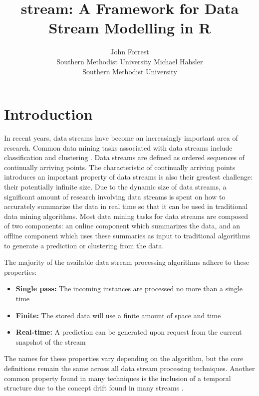 \documentclass[nojss]{jss}
\author{John Forrest\\Southern Methodist University \And
    Michael Hahsler\\Southern Methodist University}
\title{stream: A Framework for Data Stream Modelling in R}
\begin{document}

\clearpage
\tableofcontents
\clearpage

\section{Introduction}

In recent years, data streams have become an increasingly important area of research. Common data mining tasks associated with data streams include classification and clustering \citep{stream:Aggarwal:2009}. Data streams are defined as ordered sequences of continually arriving points. The characteristic of continually arriving points introduces an important property of data streams is also their greatest challenge: their potentially infinite size. Due to the dynamic size of data streams, a significant amount of research involving data streams is spent on how to accurately summarize the data in real time so that it can be used in traditional data mining algorithms. Most data mining tasks for data streams are composed of two components: an online component which summarizes the data, and an offline component which uses these summaries as input to traditional algorithms to generate a prediction or clustering from the data.


The majority of the available data stream processing algorithms adhere to these properties:

\begin{itemize}
	\item \textbf{Single pass:} The incoming instances are processed no more than a single time
	\item \textbf{Finite:} The stored data will use a finite amount of space and time
	\item \textbf{Real-time:} A prediction can be generated upon request from the current snapshot of the stream
\end{itemize}


The names for these properties vary depending on the algorithm, but the core definitions remain the same across all data stream processing techniques. Another common property found in many techniques is the inclusion of a temporal structure due to the concept drift found in many streams \citep{stream:Masud+Chen+Khan+Aggarwal+Gao+Han+Thuraisingham:2010}.
\end{document}

